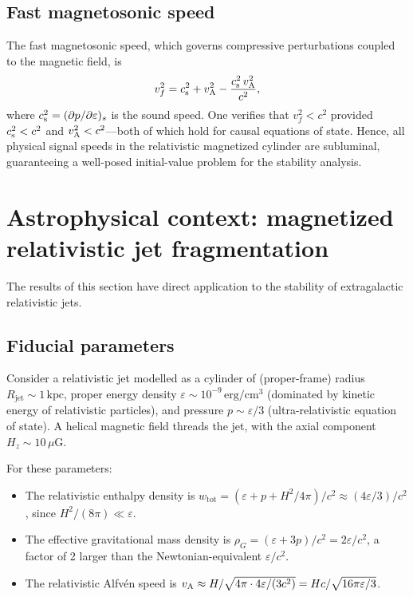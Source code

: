 \subsection{Fast magnetosonic speed}
\label{sec:rel-12-110-fastms}

The fast magnetosonic speed, which governs compressive perturbations
coupled to the magnetic field, is
\begin{equation}
\label{eq:rel-12-110-26}
v_{f}^{2} = c_{\mathrm{s}}^{2} + v_{\mathrm{A}}^{2}
- \frac{c_{\mathrm{s}}^{2}\,v_{\mathrm{A}}^{2}}{c^{2}},
\end{equation}
where $c_{\mathrm{s}}^{2} = (\partial p/\partial\varepsilon)_{s}$ is the sound
speed.  One verifies that $v_{f}^{2} < c^{2}$ provided
$c_{\mathrm{s}}^{2} < c^{2}$ and $v_{\mathrm{A}}^{2} < c^{2}$---both of which hold for
causal equations of state.  Hence, all physical signal speeds in the
relativistic magnetized cylinder are subluminal, guaranteeing a
well-posed initial-value problem for the stability analysis.

\section{Astrophysical context: magnetized relativistic jet fragmentation}
\label{sec:rel-12-110-jets}

The results of this section have direct application to the stability
of extragalactic relativistic jets.

\subsection{Fiducial parameters}
\label{sec:rel-12-110-fiducial}

Consider a relativistic jet modelled as a cylinder of (proper-frame)
radius $R_{\mathrm{jet}} \sim 1\,\mathrm{kpc}$, proper energy
density $\varepsilon \sim 10^{-9}\,\mathrm{erg/cm^{3}}$ (dominated by
kinetic energy of relativistic particles), and pressure
$p \sim \varepsilon/3$ (ultra-relativistic equation of state).  A
helical magnetic field threads the jet, with the axial component
$H_{z} \sim 10\,\mu\mathrm{G}$.

For these parameters:
\begin{itemize}
\item The relativistic enthalpy density is
  $w_{\mathrm{tot}} = (\varepsilon + p + H^{2}/4\pi)/c^{2}
  \approx (4\varepsilon/3)/c^{2}$, since $H^{2}/(8\pi) \ll \varepsilon$.
\item The effective gravitational mass density is
  $\rho_{G} = (\varepsilon + 3p)/c^{2} = 2\varepsilon/c^{2}$,
  a factor of 2 larger than the Newtonian-equivalent
  $\varepsilon/c^{2}$.
\item The relativistic Alfv\'en speed is
  $v_{\mathrm{A}} \approx H/\sqrt{4\pi\cdot 4\varepsilon/(3c^{2})}
  = Hc/\sqrt{16\pi\varepsilon/3}$.
\end{itemize}

